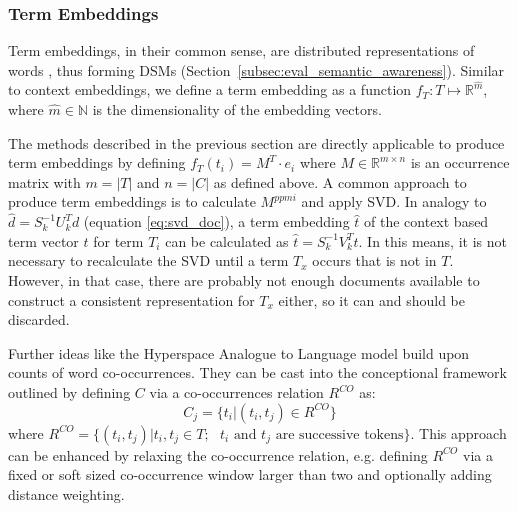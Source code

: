\subsubsection{Term Embeddings}
\label{sec:term_embeddings}
Term embeddings, in their common sense, are distributed representations of words \autocite{bengio_neural_2003}, thus forming \acp{DSM} (Section~\ref{subsec:eval_semantic_awareness}). Similar to context embeddings, we define a term embedding as a function $f_T:T \mapsto \mathbb{R}^{\hat{m}}$, where $\hat{m} \in \mathbb{N}$ is the dimensionality of the embedding vectors.

The methods described in the previous section are directly applicable to produce term embeddings by defining $f_T(t_i) = M^T \cdot e_i$ where $M \in \mathbb{R}^{m \times n}$ is an occurrence matrix with $m = |T|$ and $n = |C|$ as defined above. A common approach to produce term embeddings is to calculate $M^{ppmi}$ and apply \ac{SVD}. In analogy to $\hat{d} = S_k^{-1}U_k^Td$ (equation \eqref{eq:svd_doc}), a term embedding $\hat{t}$ of the context based term vector $t$ for term $T_i$ can be calculated as $\hat{t} = S_k^{-1}V_k^Tt$. In this means, it is not necessary to recalculate the \ac{SVD} until a term $T_x$ occurs that is not in $T$. However, in that case, there are probably not enough documents available to construct a consistent representation for $T_x$ either, so it can and should be discarded. %

Further ideas like the Hyperspace Analogue to Language model \autocite{lund_producing_1996} build upon counts of word co-occurrences. They can be cast into the conceptional framework outlined by defining $C$ via a co-occurrences relation $R^{CO}$ as:%
\begin{equation} \label{eq:co}
C_j = \{t_i|(t_i, t_j) \in R^{CO}\}
\end{equation}
where $R^{CO} = \{(t_i, t_j)|t_i, t_j \in T; \text{ $t_i$ and $t_j$ are successive tokens}\}$. This approach can be enhanced by relaxing the co-occurrence relation, e.g. defining $R^{CO}$ via a fixed or soft sized co-occurrence window larger than two and optionally adding distance weighting.

